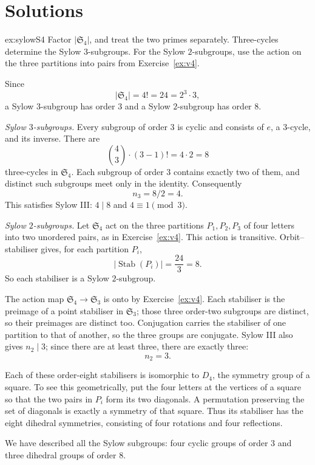 \section{Solutions}

\begin{solution}{ex:sylowS4}
\idea Factor $|\mathfrak S_4|$, and treat the two primes separately. Three-cycles determine the Sylow $3$-subgroups. For the Sylow $2$-subgroups, use the action on the three partitions into pairs from Exercise~\ref{ex:v4}.

\writeup Since
\[
|\mathfrak S_4|=4!=24=2^3\cdot3,
\]
a Sylow $3$-subgroup has order $3$ and a Sylow $2$-subgroup has order $8$.

\emph{Sylow $3$-subgroups.} Every subgroup of order $3$ is cyclic and consists of $e$, a $3$-cycle, and its inverse. There are
\[
\binom43\cdot(3-1)!=4\cdot2=8
\]
three-cycles in $\mathfrak S_4$. Each subgroup of order $3$ contains exactly two of them, and distinct such subgroups meet only in the identity. Consequently
\[
\boxed{n_3=8/2=4}.
\]
This satisfies Sylow III: $4\mid8$ and $4\equiv1\pmod3$.

\emph{Sylow $2$-subgroups.} Let $\mathfrak S_4$ act on the three partitions $P_1,P_2,P_3$ of four letters into two unordered pairs, as in Exercise~\ref{ex:v4}. This action is transitive. Orbit--stabiliser gives, for each partition $P_i$,
\[
|\operatorname{Stab}(P_i)|=\frac{24}{3}=8.
\]
So each stabiliser is a Sylow $2$-subgroup.

The action map $\mathfrak S_4\to\mathfrak S_3$ is onto by Exercise~\ref{ex:v4}. Each stabiliser is the preimage of a point stabiliser in $\mathfrak S_3$; those three order-two subgroups are distinct, so their preimages are distinct too. Conjugation carries the stabiliser of one partition to that of another, so the three groups are conjugate. Sylow III also gives $n_2\mid3$; since there are at least three, there are exactly three:
\[
\boxed{n_2=3}.
\]

Each of these order-eight stabilisers is isomorphic to $D_4$, the symmetry group of a square. To see this geometrically, put the four letters at the vertices of a square so that the two pairs in $P_i$ form its two diagonals. A permutation preserving the set of diagonals is exactly a symmetry of that square. Thus its stabiliser has the eight dihedral symmetries, consisting of four rotations and four reflections.

We have described all the Sylow subgroups: four cyclic groups of order $3$ and three dihedral groups of order $8$.
\end{solution}

